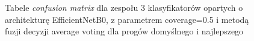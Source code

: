 \documentclass[polish,12pt]{aghthesis}
\begin{document}
\begin{figure}[H]
    \begin{adjustbox}{minipage=1.0\paperwidth, pagecenter}
    \centering
    \qquad
    \end{adjustbox}
    \label{fig:eff-ens-3-0.5-avg-thresh-matrices}
    \caption{Tabele \textit{confusion matrix} dla zespołu 3 klasyfikatorów opartych o architekturę EfficientNetB0, z parametrem coverage=0.5 i metodą fuzji decyzji average voting dla progów domyślnego i najlepszego}
\end{figure}
\end{document}
